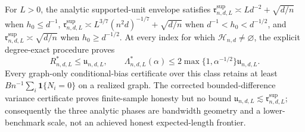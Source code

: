 For \(L>0\), the analytic supported-unit envelope satisfies \(\mathfrak r^{\mathrm{sup}}_{n,d,L}\asymp Ld^{-2}+\sqrt{d/n}\) when \(h_0\leq d^{-1}\), \(\mathfrak r^{\mathrm{sup}}_{n,d,L}\asymp L^{3/7}(n^2d)^{-1/7}+\sqrt{d/n}\) when \(d^{-1}<h_0<d^{-1/2}\), and \(\mathfrak r^{\mathrm{sup}}_{n,d,L}\asymp\sqrt{d/n}\) when \(h_0\geq d^{-1/2}\).  At every index for which \(\mathcal H_{n,d}\ne\varnothing\), the explicit degree-exact procedure proves
\[
 R^*_{n,d,L}\leq\mathfrak u_{n,d,L},
 \qquad
 \Lambda^*_{n,d,L}(\alpha)
 \leq2\max\{1,\alpha^{-1/2}\}\mathfrak u_{n,d,L}.
\]
Every graph-only conditional-bias certificate over this class retains at least \(Bn^{-1}\sum_i\mathbf1\{N_i=0\}\) on a realized graph.  The corrected bounded-difference variance certificate proves finite-sample honesty but no bound \(\mathfrak u_{n,d,L}\lesssim\mathfrak r^{\mathrm{sup}}_{n,d,L}\); consequently the three analytic phases are bandwidth geometry and a lower-benchmark scale, not an achieved honest expected-length frontier.